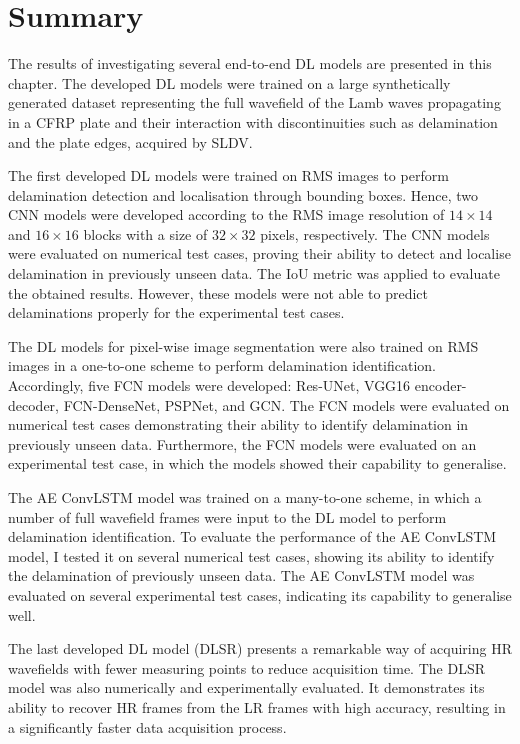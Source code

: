\section{Summary}
\label{sec55}

The results of investigating several end-to-end DL models are presented in this chapter. 
The developed DL models were trained on a large synthetically generated dataset representing the full wavefield of the Lamb waves propagating in a CFRP plate and their interaction with discontinuities such as delamination and the plate edges, acquired by SLDV. 

The first developed DL models were trained on RMS images to perform delamination detection and localisation through bounding boxes.
Hence, two CNN models were developed according to the RMS image resolution of $14\times14$ and $16\times16$ blocks with a size of $32\times32$ pixels, respectively.
The CNN models were evaluated on numerical test cases, proving their ability to detect and localise delamination in previously unseen data.
The IoU metric was applied to evaluate the obtained results.
However, these models were not able to predict delaminations properly for the experimental test cases.

The DL models for pixel-wise image segmentation were also trained on RMS images in a one-to-one scheme to perform delamination identification.
Accordingly, five FCN models were developed: Res-UNet, VGG16 encoder-decoder, FCN-DenseNet, PSPNet, and GCN.
The FCN models were evaluated on numerical test cases demonstrating their ability to identify delamination in previously unseen data. 
Furthermore, the FCN models were evaluated on an experimental test case, in which the models showed their capability to generalise.

The AE ConvLSTM model was trained on a many-to-one scheme, in which a number of full wavefield frames were input to the DL model to perform delamination identification.
To evaluate the performance of the AE ConvLSTM model, I tested it on several numerical test cases, showing its ability to identify the delamination of previously unseen data.
The AE ConvLSTM model was evaluated on several experimental test cases, indicating its capability to generalise well.

The last developed DL model (DLSR) presents a remarkable way of acquiring HR wavefields with fewer measuring points to reduce acquisition time.
The DLSR model was also numerically and experimentally evaluated. 
It demonstrates its ability to recover HR frames from the LR frames with high accuracy, resulting in a significantly faster data acquisition process.



